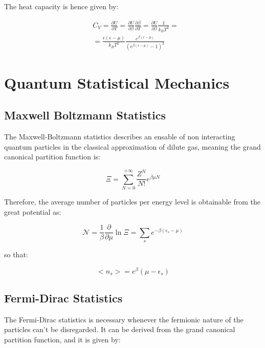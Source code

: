 \documentclass{article}
\begin{document}
The heat capacity is hence given by:

\begin{equation}
    \begin{aligned}
         & C_V=\frac{\partial U}{\partial T}= \frac{\partial U}{\partial \beta}\frac{\partial \beta}{\partial T}= \frac{\partial U}{\partial \beta}\frac{1}{k_B T^2}= \\
         & =\frac{\epsilon (\epsilon-\mu)}{k_B T^2}\frac{e^{\beta(\epsilon-\mu)}}{(e^{\beta(\epsilon-\mu)}-1)^2}
    \end{aligned}
\end{equation}

\newpage

\section{Quantum Statistical Mechanics}

\subsection{Maxwell Boltzmann Statistics}

The Maxwell-Boltzmann statistics describes an ensable of non interacting quantum particles in the classical
approximation of dilute gas, meaning the grand canonical partition function is:

\begin{equation}
    \Xi=\sum_{N=0}^{+\infty}\frac{Z^N}{N!}e^{\beta\mu N}
\end{equation}

Therefore, the average number of particles per energy level is obtainable from the great potential as:

\begin{equation}
    \mathcal{N}=\frac{1}{\beta}\frac{\partial}{\partial \mu}\ln{\Xi}=\sum_{s} e^{-\beta(\epsilon_s-\mu)}
\end{equation}

so that:

\begin{equation}
    <n_s>=e^\beta(\mu-\epsilon_s)
\end{equation}


\subsection{Fermi-Dirac Statistics}

The Fermi-Dirac statistics is necessary whenever the fermionic nature of the particles
can't be disregarded.
It can be derived from the grand canonical partition function, and it is given by:
\end{document}
